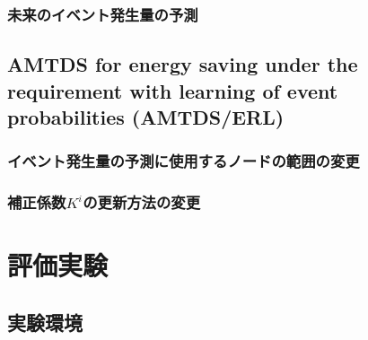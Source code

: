 \documentclass[12pt,a4j,twoside]{jarticle}
\begin{document}
  \subsubsection{未来のイベント発生量の予測}
  
  \subsection{AMTDS for energy saving under the requirement with learning of  event probabilities (AMTDS/ERL)}
  
  \subsubsection{イベント発生量の予測に使用するノードの範囲の変更}
  
  \subsubsection{補正係数$K^i$の更新方法の変更}
  
  \section{評価実験}

  \subsection{実験環境}
  
\end{document}
